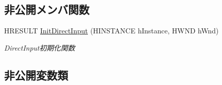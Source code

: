 \subsection*{非公開メンバ関数}
\begin{DoxyCompactItemize}
\item 
H\+R\+E\+S\+U\+LT \mbox{\hyperlink{class_keyboard_adb5e03226ff7b5217b47db119825fb08}{Init\+Direct\+Input}} (H\+I\+N\+S\+T\+A\+N\+CE h\+Instance, H\+W\+ND h\+Wnd)
\begin{DoxyCompactList}\small\item\em Direct\+Input初期化関数 \end{DoxyCompactList}\end{DoxyCompactItemize}
\subsection*{非公開変数類}
